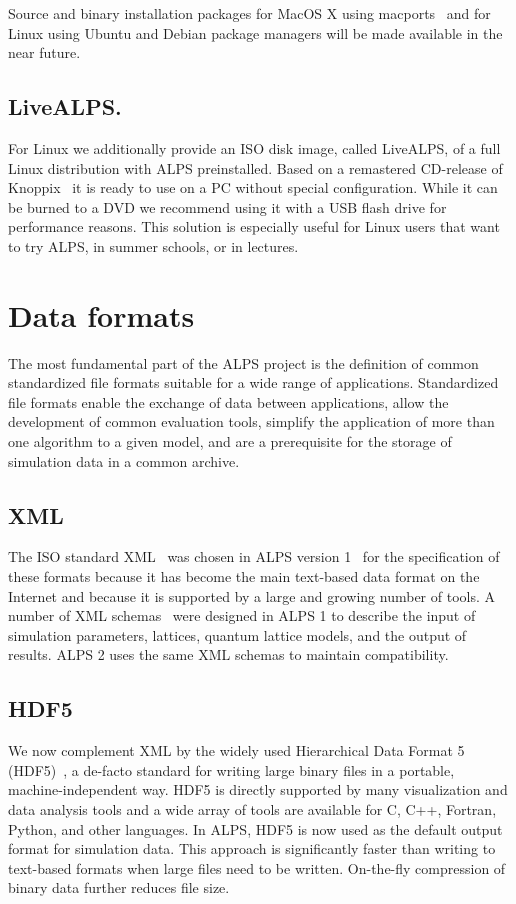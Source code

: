 \documentclass[12pt]{iopart}
\begin{document}
Source and binary installation packages for MacOS X using macports~\cite{macports} and for Linux using Ubuntu and Debian package managers will be made available in the near future.


\subsection{LiveALPS.}

For Linux we additionally provide an ISO disk image, called LiveALPS, of a full Linux distribution with ALPS preinstalled.    
Based on a remastered CD-release of Knoppix~\cite{knoppix} it is ready to use 
on a PC without special configuration. While it can be burned to a DVD we recommend using it with a USB flash drive for performance reasons.
This  solution is especially useful for Linux users that want to try ALPS, in summer schools, or in lectures.

\section{Data formats}

The most fundamental part of the ALPS project is the definition of
common standardized file formats suitable for a wide range of
applications. Standardized file formats enable the exchange of data
between applications, allow the development of common evaluation
tools, simplify the application of more than one algorithm to a given
model, and are a prerequisite for the storage of simulation data in a
common archive.

\subsection{XML}
 The ISO
standard XML~\cite{xml} was chosen in ALPS version 1~\cite{ALPS1.2,ALPS1.3} for the specification of these formats
because it has become
the main text-based data format on the Internet and because it is
supported by a large and growing number of tools.
A number of XML  schemas~\cite{xmlschema} were designed in ALPS 1 to describe the input of simulation parameters, lattices,  quantum lattice models, and the output of results. ALPS 2 uses the same XML schemas to maintain compatibility.

\subsection{HDF5}

We now complement XML by the widely used Hierarchical Data Format 5 (HDF5)~\cite{hdf5}, a de-facto standard for writing large binary files in a portable, machine-independent way.  HDF5 is directly supported by many visualization and data analysis tools and a wide array of tools are 
available for C, C++, Fortran, Python, and other languages. In ALPS, HDF5 is now used as the default output format for simulation data.  This approach is significantly faster than writing to text-based formats when large files need to be written. On-the-fly compression of binary data further reduces file size. 
\end{document}
